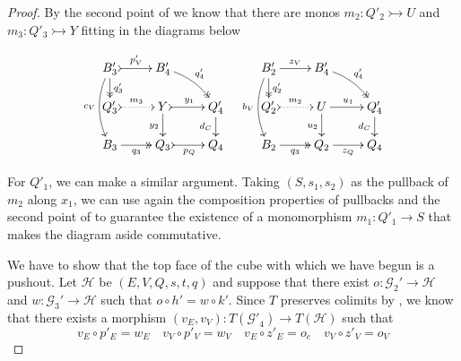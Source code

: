 \documentclass[a4paper,UKenglish,cleveref,pdftex,amsthm,thm-restate,numberwithinsect]{cas-sc}
\theoremstyle{plain}
\theoremstyle{definition}
\def\B{\textbf {\textup{B}}}
\newcommand{\commentato}[1]{ {} }
\newcommand{\mto}{\rightarrowtail}
\begin{document}
\begin{proof}
	By the second point of  we know that there are monos $m_2\colon Q'_2\mto U$ and $m_3\colon Q'_3\mto Y$  fitting in the diagrams below
	
	\[\xymatrix@R=15pt{B'_3 \ar@{>>}[d]^{q'_3} \ar@/_.3cm/[dd]_{c_V} \ar@{>->}[r]^{p'_V}& B'_4 \ar@/^.2cm/@{>>}[dr]^{q'_4} & & B'_2 \ar[r]^{z_V} \ar@{>>}[d]^{q'_2} \ar@/_.3cm/[dd]_{b_V}& B'_4 \ar@/^.2cm/@{>>}[dr]^{q'_4}\\ Q'_3 \ar@{>.>}[r]^{m_3}& Y  \ar@{>->}[r]^{y_1} \ar[d]_{y_2}& Q'_4 \ar[d]_{d_C}& Q'_2 \ar@{>.>}[r]^{m_2} & U \ar[d]_{u_2} \ar[r]^{u_1} & Q'_4 \ar[d]_{d_C} \\ B_3 \ar@{>>}[r]_{q_3} & Q_3 \ar@{>->}[r]_{p_Q} & Q_4 &B_2 \ar@{>>}[r]_{q_3} & Q_2 \ar[r]_{z_Q} & Q_4}\]

\newpage
	\noindent 
	\parbox{8.5cm}{\hspace{15pt}
	For $Q'_1$, we can make a similar argument. Taking $(S, s_1, s_2)$ as the pullback of $m_2$ along $x_1$, we can use again the composition properties of pullbacks and the second point of  to guarantee the existence of a monomorphism $m_1\colon Q'_1\to S$ that makes the diagram aside commutative.}\hfill
	\parbox{4cm}{}

We have to show that the top face of the cube with which we have begun is a pushout. Let $\mathcal{H}$ be $(E, V, Q, s, t, q)$ and suppose that there exist  $o\colon  \mathcal{G}_2' \to \mathcal{H}$ and $w\colon  \mathcal{G}_3' \to \mathcal{H}$ such that $o \circ h' = w \circ k'$. Since $T$ preserves colimits by , we know that there exists a morphism $(v_E, v_V)\colon T(\mathcal{G'}_4)\to T(\mathcal{H})$ such that
\[v_E\circ p'_E=w_E \quad v_V\circ p'_V=w_V \quad v_E\circ z'_E=o_e \quad v_V\circ z'_V=o_V\]

\commentato{\xymatrix@C=10pt@R=6pt{
		&B_1'\ar@{>>}[dd]|\hole_(.65){q_1'}\ar@{>->}[rr]^{h_V'} \ar[dl]_(.6){k_V'} && B_2' \ar@{>>}[dd]|\hole_(.65){q_2'} \ar[dl]_(.6){z_V'}\ar[dr]^{o_V}\\
		B_3'  \ar@{>>}[dd]_{q_3'}\ar@{>->}[rr]^(.7){p_V'} & & B_4' \ar@{>>}[dd]_(.3){q_4'} \ar[rr]^(.7){v_V}&&  V\ar[dd]^{q}\\
		&Q_1'\ar@{>->}[rr]|\hole^(.65){h'_Q} \ar[dl]_{k'_Q} && Q_2' \ar[dl]^(.4){z_Q'}\ar[dr]^{o_Q}\\
		Q'_3 \ar@{>->}[rr]_{p_Q'} & & Q'_4\ar@{.>}[rr]_{v_C} && Q
}}


\end{proof}
\end{document}
